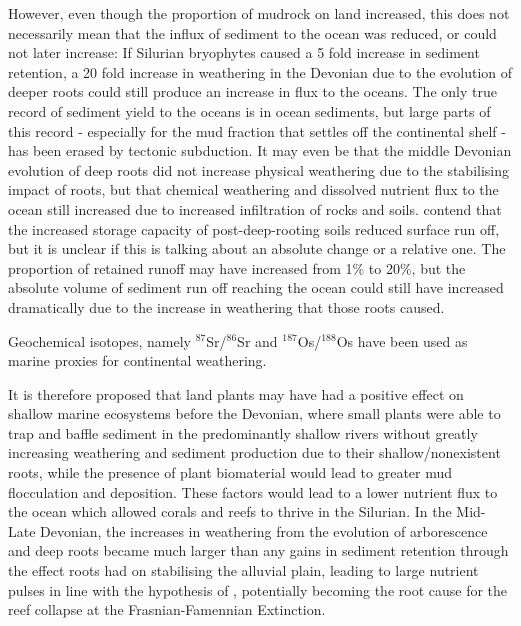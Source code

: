 \documentclass[11pt,a4paper]{article}
\begin{document}
However, even though the proportion of mudrock on land increased, this does not necessarily mean that the influx of sediment to the ocean was reduced, or could not later increase: If Silurian bryophytes caused a 5 fold increase in sediment retention, a 20 fold increase in weathering in the Devonian due to the evolution of deeper roots could still produce an increase in flux to the oceans. The only true record of sediment yield to the oceans is in ocean sediments, but large parts of this record - especially for the mud fraction that settles off the continental shelf - has been erased by tectonic subduction. It may even be that the middle Devonian evolution of deep roots did not increase physical weathering due to the stabilising impact of roots, but that chemical weathering and dissolved nutrient flux to the ocean still increased due to increased infiltration of rocks and soils. \cite{Davies2010} contend that the increased storage capacity of post-deep-rooting soils reduced surface run off, but it is unclear if this is talking about an absolute change or a relative one. The proportion of retained runoff may have increased from 1\% to 20\%, but the absolute volume of sediment run off reaching the ocean could still have increased dramatically due to the increase in weathering that those roots caused.
 
Geochemical isotopes, namely $^{87}$Sr/$^{86}$Sr and $^{187}$Os/$^{188}$Os \citep{Percival2019} have been used as marine proxies for continental weathering.

It is therefore proposed that land plants may have had a positive effect on shallow marine ecosystems before the Devonian, where small plants were able to trap and baffle sediment in the predominantly shallow rivers without greatly increasing weathering and sediment production due to their shallow/nonexistent roots, while the presence of plant biomaterial would lead to greater mud flocculation and deposition. These factors would lead to a lower nutrient flux to the ocean which allowed corals and reefs to thrive in the Silurian. In the Mid-Late Devonian, the increases in weathering from the evolution of arborescence and deep roots became much larger than any gains in sediment retention through the effect roots had on stabilising the alluvial plain, leading to large nutrient pulses in line with the hypothesis of \cite{Algeo1995}, potentially becoming the root cause for the reef collapse at the Frasnian-Famennian Extinction.
\end{document}
